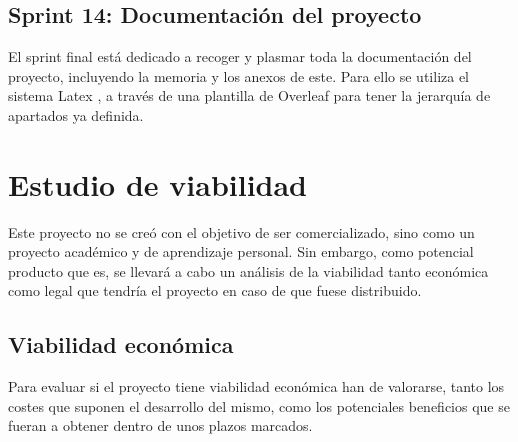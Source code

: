 \subsection{Sprint 14: Documentación del proyecto}
El sprint final está dedicado a recoger y plasmar toda la documentación del proyecto, incluyendo la memoria y los anexos de este. Para ello se utiliza el sistema Latex \cite{wiki:Latex}, a través de una plantilla de Overleaf \cite{wiki:Overleaf} para tener la jerarquía de apartados ya definida.

\section{Estudio de viabilidad}
Este proyecto no se creó con el objetivo de ser comercializado, sino como un proyecto académico y de aprendizaje personal. Sin embargo, como potencial producto que es, se llevará a cabo un análisis de la viabilidad tanto económica como legal que tendría el proyecto en caso de que fuese distribuido.
\subsection{Viabilidad económica}
Para evaluar si el proyecto tiene viabilidad económica han de valorarse, tanto los costes que suponen el desarrollo del mismo, como los potenciales beneficios que se fueran a obtener dentro de unos plazos marcados.

